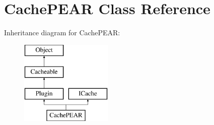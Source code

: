 \hypertarget{class_cache_p_e_a_r}{\section{Cache\-P\-E\-A\-R Class Reference}
\label{class_cache_p_e_a_r}
}
Inheritance diagram for Cache\-P\-E\-A\-R\-:\begin{figure}[H]
\begin{center}
\leavevmode
\includegraphics[height=4.000000cm]{class_cache_p_e_a_r}
\end{center}
\end{figure}
